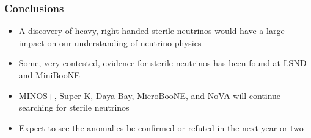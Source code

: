 \documentclass[mathserif,18pt,xcolor=table]{beamer}
\begin{document}
\begin{frame}
  \frametitle{Conclusions}
  \begin{itemize}
  \item A discovery of heavy, right-handed sterile neutrinos would have a large impact on our understanding of neutrino physics
  \item Some, very contested, evidence for sterile neutrinos has been found at LSND and MiniBooNE
  \item MINOS+, Super-K, Daya Bay, MicroBooNE, and NoVA will continue searching for sterile neutrinos
  \item Expect to see the anomalies be confirmed or refuted in the next year or two
  \end{itemize}
\end{frame}
\end{document}
